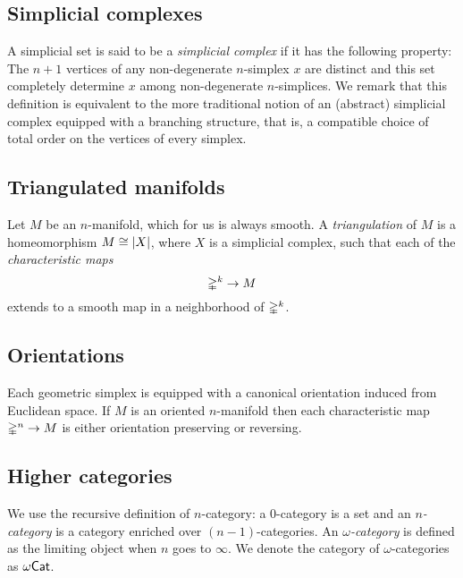 \subsection{Simplicial complexes}

A simplicial set is said to be a \textit{simplicial complex} if it has the following property: The $n+1$ vertices of any non-degenerate $n$-simplex $x$ are distinct and this set completely determine $x$ among non-degenerate $n$-simplices.
We remark that this definition is equivalent to the more traditional notion of an (abstract) simplicial complex equipped with a branching structure, that is, a compatible choice of total order on the vertices of every simplex.

\subsection{Triangulated manifolds}

Let $M$ be an $n$-manifold, which for us is always smooth.
A \textit{triangulation} of $M$ is a homeomorphism $M \cong \lvert X\rvert$, where $X$ is a simplicial complex, such that each of the \textit{characteristic maps}
\[
\mathbb{\Delta}^k \to M
\]
extends to a smooth map in a neighborhood of $\mathbb{\Delta}^k$.


\subsection{Orientations}

Each geometric simplex is equipped with a canonical orientation induced from Euclidean space.
If $M$ is an oriented $n$-manifold then each characteristic map $\mathbb{\Delta}^n \to M$ is either orientation preserving or reversing.

\subsection{Higher categories}

We use the recursive definition of $n$-category: a $0$-category is a set and an \textit{$n$-category} is a category enriched over $(n-1)$-categories.
An \textit{\mbox{$\omega$-category}} is defined as the limiting object when $n$ goes to $\infty$.
We denote the category of $\omega$-categories as $\omega\mathsf{Cat}$.

